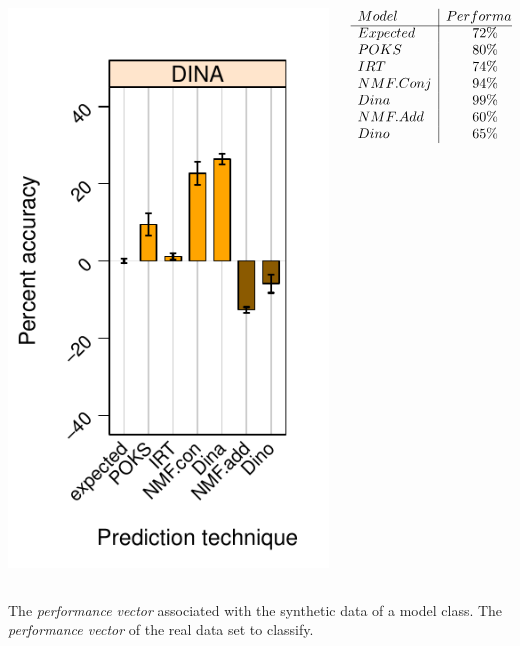 \documentclass{beamer}
\begin{document}
\begin{frame}
\begin{overprint}
\begin{columns}
\begin{column}{0.5\textwidth}
   \includegraphics[trim=0cm 0cm 0cm 1.5cm,clip=true,scale =0.55] {images/Predictive-Preformace_Base.pdf}

		 \end{column}
	      \begin{column}{0.5\textwidth}
	      \[\begin{array}{l|c}
	      Model & Performace\\
	      \cline{1-2}
			Expected & 72\%\\
			POKS & 80\%\\
			IRT & 74\%\\
			NMF.Conj & 94\%\\
			Dina & 99\%\\
			NMF.Add & 60\%\\
			Dino & 65\%
			\end{array}
			\]
	      \end{column}
	     \end{columns}
\vspace{3cm} The \textit{performance vector} associated with the synthetic data of a model class.
\vspace{3cm} The \textit{performance vector} of the real data set to classify.
\end{overprint}
\end{frame}
\end{document}
